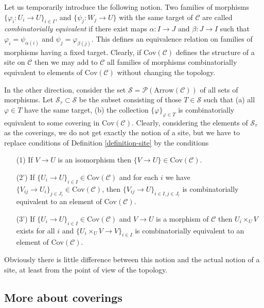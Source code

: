 \begin{remark}
\label{remark-combinatorial-equivalence}
Let us temporarily introduce the following notion.
Two families of morphisms $\{\varphi_i : U_i \to U\}_{i\in I}$, and
$\{\psi_j : W_j \to U\}$ with the same target of $\mathcal{C}$ are
called {\it combinatorially equivalent} if there exist maps
$\alpha : I \to J$ and $\beta : J\to I$ such that
$\varphi_i = \psi_{\alpha(i)}$ and $\psi_j = \varphi_{\beta(j)}$.
This defines an equivalence relation on families of morphisms
having a fixed target. Clearly, if $\text{Cov}(\mathcal{C})$
defines the structure of a site on $\mathcal{C}$ then we may
add to $\mathcal{C}$ all families of morphisms combinatorially
equivalent to elements of $\text{Cov}(\mathcal{C})$ without
changing the topology.

\medskip\noindent
In the other direction, consider the set
$\mathcal{S} = \mathcal{P}(\text{Arrow}(\mathcal{C}))$
of all sets of morphisms. Let $\mathcal{S}_\tau \subset \mathcal{S}$
be the subset consisting of those $T \in \mathcal{S}$ such that
(a) all $\varphi \in T$ have the same target,
(b) the collection $\{\varphi\}_{\varphi \in T}$ is combinatorially
equivalent to some covering in $\text{Cov}(\mathcal{C})$.
Clearly, considering the elements of $\mathcal{S}_\tau$ as
the coverings, we do not get exactly the notion of a site,
but we have to replace conditions of 
Definition \ref{definition-site} by the conditions
\begin{enumerate}
\item[(1)] If $V \to U$ is an isomorphism then $\{V \to U\} \in 
\text{Cov}(\mathcal{C})$.
\item[(2')] If $\{U_i \to U\}_{i\in I} \in \text{Cov}(\mathcal{C})$
and for each $i$ we have
$\{V_{ij} \to U_i\}_{j\in J_i} \in \text{Cov}(\mathcal{C})$, then
$\{V_{ij} \to U\}_{i \in I, j\in J_i}$ is combinatorially
equivalent to an element of $\text{Cov}(\mathcal{C})$.
\item[(3')] If $\{U_i \to U\}_{i\in I}\in \text{Cov}(\mathcal{C})$
and $V \to U$ is a morphism of $\mathcal{C}$ then $U_i \times_U V$
exists for all $i$ and $\{U_i \times_U V \to V \}_{i\in I}$
is combinatorially equivalent to an element of $\text{Cov}(\mathcal{C})$.
\end{enumerate}
Obviously there is little difference between this notion and the
actual notion of a site, at least from the point of view of the
topology.
\end{remark}

\subsection{More about coverings}
\label{subsection-coverings}

